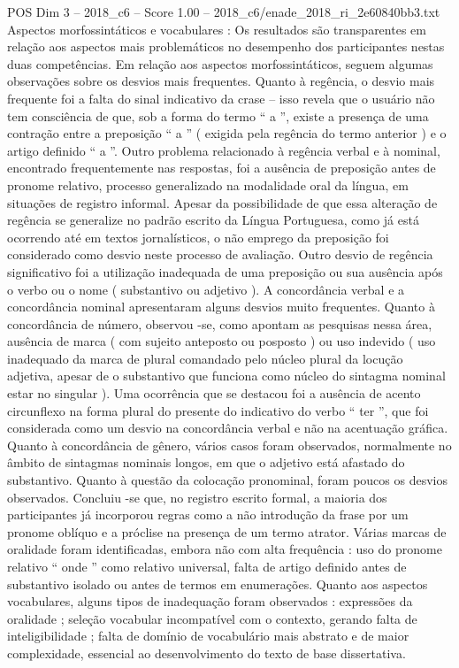 \begin{textsample}{POS Dim 3 – 2018\_c6 – Score 1.00 – 2018\_c6/enade\_2018\_ri\_2e60840bb3.txt}
Aspectos morfossintáticos e vocabulares : Os resultados são transparentes em relação aos aspectos mais problemáticos no desempenho dos participantes nestas duas competências.
Em relação aos aspectos morfossintáticos, seguem algumas observações sobre os desvios mais frequentes.
Quanto à regência, o desvio mais frequente foi a falta do sinal indicativo da crase – isso revela que o usuário não tem consciência de que, sob a forma do termo “ a ”, existe a presença de uma contração entre a preposição “ a ” ( exigida pela regência do termo anterior ) e o artigo definido “ a ”.
Outro problema relacionado à regência verbal e à nominal, encontrado frequentemente nas respostas, foi a ausência de preposição antes de pronome relativo, processo generalizado na modalidade oral da língua, em situações de registro informal.
Apesar da possibilidade de que essa alteração de regência se generalize no padrão escrito da Língua Portuguesa, como já está ocorrendo até em textos jornalísticos, o não emprego da preposição foi considerado como desvio neste processo de avaliação.
Outro desvio de regência significativo foi a utilização inadequada de uma preposição ou sua ausência após o verbo ou o nome ( substantivo ou adjetivo ).
A concordância verbal e a concordância nominal apresentaram alguns desvios muito frequentes.
Quanto à concordância de número, observou -se, como apontam as pesquisas nessa área, ausência de marca ( com sujeito anteposto ou posposto ) ou uso indevido ( uso inadequado da marca de plural comandado pelo núcleo plural da locução adjetiva, apesar de o substantivo que funciona como núcleo do sintagma nominal estar no singular ).
Uma ocorrência que se destacou foi a ausência de acento circunflexo na forma plural do presente do indicativo do verbo “ ter ”, que foi considerada como um desvio na concordância verbal e não na acentuação gráfica.
Quanto à concordância de gênero, vários casos foram observados, normalmente no âmbito de sintagmas nominais longos, em que o adjetivo está afastado do substantivo.
Quanto à questão da colocação pronominal, foram poucos os desvios observados.
Concluiu -se que, no registro escrito formal, a maioria dos participantes já incorporou regras como a não introdução da frase por um pronome oblíquo e a próclise na presença de um termo atrator.
Várias marcas de oralidade foram identificadas, embora não com alta frequência : uso do pronome relativo “ onde ” como relativo universal, falta de artigo definido antes de substantivo isolado ou antes de termos em enumerações.
Quanto aos aspectos vocabulares, alguns tipos de inadequação foram observados : expressões da oralidade ; seleção vocabular incompatível com o contexto, gerando falta de inteligibilidade ; falta de domínio de vocabulário mais abstrato e de maior complexidade, essencial ao desenvolvimento do texto de base dissertativa.

\end{textsample}
